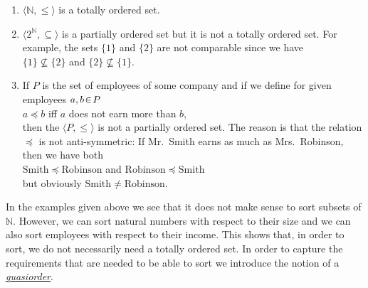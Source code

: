 \examples
\begin{enumerate}
\item $\langle\mathbb{N}, \leq \rangle$ is a totally ordered set.
\item $\langle 2^{\mathbb{N}}, \subseteq \rangle$ is a partially ordered set but it is not a totally
      ordered set.  For example, the sets $\{1\}$ and $\{2\}$ are not comparable since we have
      \\[0.2cm]
      \hspace*{1.3cm}
      $\{1\} \not\subseteq \{2\}$ \quad and \quad  $\{2\} \not\subseteq \{1\}$.
\item If $P$ is the set of employees of some company and if we define for given employees
      $a,b \!\in\! P$
      \\[0.2cm]
      \hspace*{1.3cm}
      $a \preceq b$ \quad iff \quad  $a$ does not earn more than $b$, 
      \\[0.2cm]
      then the $\langle P, \leq \rangle$ is not a partially ordered set.  The reason is that
      the relation $\preceq$ is not anti-symmetric:  If Mr.~Smith earns as much as
      Mrs.~Robinson, then we have both
      \\[0.2cm]
      \hspace*{1.3cm}
      $\mathrm{Smith} \preceq \mathrm{Robinson}$ \quad and \quad $\mathrm{Robinson} \preceq \mathrm{Smith}$
      \\[0.2cm]
      but obviously $\mathrm{Smith} \not= \mathrm{Robinson}$.
\end{enumerate}
In the examples given above we see that it does not make sense to sort subsets of $\mathbb{N}$.
However, we can sort natural numbers with respect to their size and we can also sort employees with
respect to their income.  This shows that, in order to sort,  we do not necessarily need a totally
ordered set.  In order to capture the requirements that are needed to be able to sort we introduce
the notion of a \href{http://en.wikipedia.org/wiki/Preorder}{\emph{quasiorder}}.


